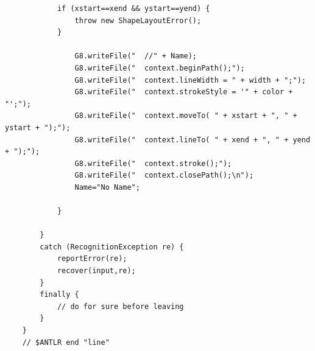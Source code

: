 \documentclass[a4paper]{article}
\begin{document}
\begin{verbatim}
			if (xstart==xend && ystart==yend) {
				throw new ShapeLayoutError();
			}
			
				G8.writeFile("	//" + Name);
				G8.writeFile("	context.beginPath();");
				G8.writeFile("	context.lineWidth = " + width + ";");
				G8.writeFile("	context.strokeStyle = '" + color + "';");
				G8.writeFile("	context.moveTo( " + xstart + ", " + ystart + ");");
				G8.writeFile("	context.lineTo( " + xend + ", " + yend + ");");
				G8.writeFile("	context.stroke();");
				G8.writeFile("	context.closePath();\n");
				Name="No Name";
					
			}

		}
		catch (RecognitionException re) {
			reportError(re);
			recover(input,re);
		}
		finally {
			// do for sure before leaving
		}
	}
	// $ANTLR end "line"
	
\end{verbatim}

\newpage
\end{document}
